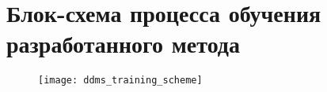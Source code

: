 \chapter{Блок-схема процесса обучения разработанного метода}
\label{app:DDMS:TrainingScheme}
\begin{figure}[H]
\texttt{[image: ddms\_training\_scheme]}
\end{figure}